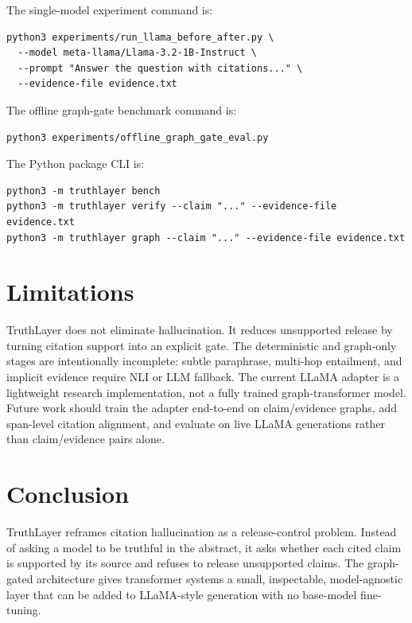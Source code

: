 \documentclass[11pt]{article}
\begin{document}
The single-model experiment command is:
\begin{verbatim}
python3 experiments/run_llama_before_after.py \
  --model meta-llama/Llama-3.2-1B-Instruct \
  --prompt "Answer the question with citations..." \
  --evidence-file evidence.txt
\end{verbatim}

The offline graph-gate benchmark command is:
\begin{verbatim}
python3 experiments/offline_graph_gate_eval.py
\end{verbatim}

The Python package CLI is:
\begin{verbatim}
python3 -m truthlayer bench
python3 -m truthlayer verify --claim "..." --evidence-file evidence.txt
python3 -m truthlayer graph --claim "..." --evidence-file evidence.txt
\end{verbatim}

\section{Limitations}
TruthLayer does not eliminate hallucination. It reduces unsupported release by turning citation support into an explicit gate. The deterministic and graph-only stages are intentionally incomplete: subtle paraphrase, multi-hop entailment, and implicit evidence require NLI or LLM fallback. The current LLaMA adapter is a lightweight research implementation, not a fully trained graph-transformer model. Future work should train the adapter end-to-end on claim/evidence graphs, add span-level citation alignment, and evaluate on live LLaMA generations rather than claim/evidence pairs alone.

\section{Conclusion}
TruthLayer reframes citation hallucination as a release-control problem. Instead of asking a model to be truthful in the abstract, it asks whether each cited claim is supported by its source and refuses to release unsupported claims. The graph-gated architecture gives transformer systems a small, inspectable, model-agnostic layer that can be added to LLaMA-style generation with no base-model fine-tuning.



\end{document}
